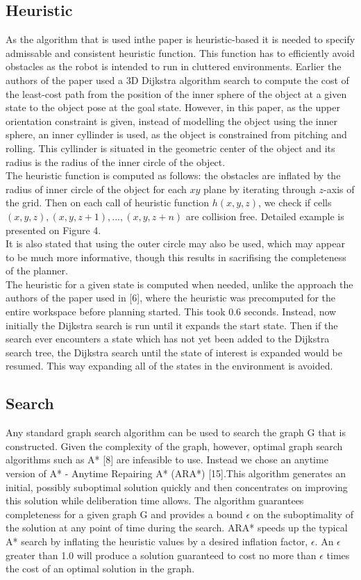 \documentclass[11pt]{article}
\begin{document}
\subsection{Heuristic}
As the algorithm that is used inthe paper is heuristic-based it is needed to specify admissable and consistent heuristic function. This function has to efficiently avoid obstacles as the robot is intended to run in cluttered environments. Earlier the authors of the paper used a 3D Dijkstra algorithm search to compute the cost of the least-cost path from the position of the inner sphere of the object at a given state to the object pose at the goal state. However, in this paper, as the upper orientation constraint is given, instead of modelling the object using the inner sphere, an inner cyllinder is used, as the object is constrained from pitching and rolling. This cyllinder is situated in the geometric center of the object and its radius is the radius of the inner circle of the object.\\
The heuristic function is computed as follows: the obstacles are inflated by the radius of inner circle of the object for each $xy$ plane by iterating through $z$-axis of the grid. Then on each call of heuristic function $h(x,y,z)$, we check if cells $(x,y,z),(x,y,z+1),...,(x,y,z+n)$ are collision free. Detailed example is presented on Figure 4.\\
It is also stated that using the outer circle may also be used, which may appear to be much more informative, though this results in sacrifising the completeness of the planner.\\
The heuristic for a given state is computed when needed, unlike the approach the authors of the paper used in [6], where the heuristic was precomputed for the entire workspace before planning started. This took 0.6 seconds. Instead, now initially the Dijkstra search is run until it expands the start state. Then if the search ever encounters a state which has not yet been added to the Dijkstra search tree, the Dijkstra search until the state of interest is expanded would be resumed. This way expanding all of the states in the environment is avoided.\\
\subsection{Search}
Any standard graph search algorithm can be used to search the graph G that is constructed. Given the complexity of the graph, however, optimal graph search algorithms such as A* [8] are infeasible to use. Instead we chose an anytime version of A* - Anytime Repairing A* (ARA*) [15].This algorithm generates an initial, possibly suboptimal solution quickly and then concentrates on improving this solution while deliberation time allows. The algorithm guarantees completeness for a given graph G and provides a bound $\epsilon$ on the suboptimality of the solution at any point of time during the search. ARA* speeds up the typical A* search by inflating the heuristic values by a desired inflation factor, $\epsilon$. An $\epsilon$ greater than 1.0 will produce a solution guaranteed to cost no more than $\epsilon$ times the cost of an optimal solution in the graph.
\end{document}
